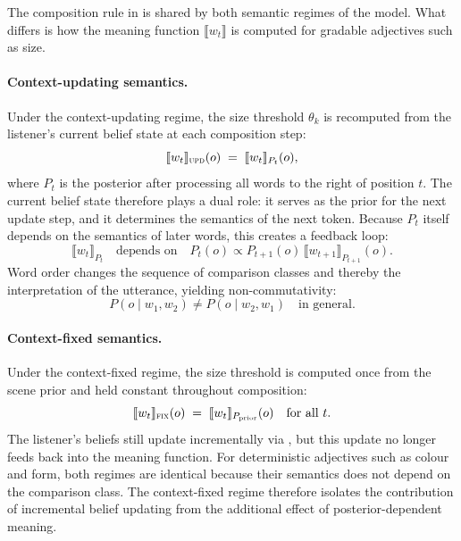 \documentclass[man,floatsintext]{apa7}
\begin{document}
The composition rule in  is shared by both semantic regimes of the model.
What differs is how the meaning function $\llbracket w_t \rrbracket$ is computed for gradable adjectives such as size.

\paragraph{Context-updating semantics.}
Under the context-updating regime, the size threshold $\theta_k$ is recomputed from the listener's current belief state at each composition step:
\begin{equation}
  \llbracket w_t \rrbracket_{\textsc{upd}}(o)
  \;=\; \llbracket w_t \rrbracket_{P_t}(o),
  \label{eq:context_updating}
\end{equation}
where $P_t$ is the posterior after processing all words to the right of position $t$.
The current belief state therefore plays a dual role: it serves as the prior for the next update step, and it determines the semantics of the next token.
Because $P_t$ itself depends on the semantics of later words, this creates a feedback loop:
\begin{equation}
  \llbracket w_t \rrbracket_{P_t}
  \quad\text{depends on}\quad
  P_t(o) \propto P_{t+1}(o)\,\llbracket w_{t+1} \rrbracket_{P_{t+1}}(o).
  \label{eq:context_recursion}
\end{equation}
Word order changes the sequence of comparison classes and thereby the interpretation of the utterance, yielding non-commutativity:
\begin{equation}
  P(o \mid w_1, w_2) \neq P(o \mid w_2, w_1)
  \quad\text{in general.}
  \label{eq:noncommutativity}
\end{equation}

\paragraph{Context-fixed semantics.}
Under the context-fixed regime, the size threshold is computed once from the scene prior and held constant throughout composition:
\begin{equation}
  \llbracket w_t \rrbracket_{\textsc{fix}}(o)
  \;=\; \llbracket w_t \rrbracket_{P_{\mathrm{prior}}}(o)
  \quad\text{for all } t.
  \label{eq:context_fixed}
\end{equation}
The listener's beliefs still update incrementally via , but this update no longer feeds back into the meaning function.
For deterministic adjectives such as colour and form, both regimes are identical because their semantics does not depend on the comparison class.
The context-fixed regime therefore isolates the contribution of incremental belief updating from the additional effect of posterior-dependent meaning.
\end{document}
